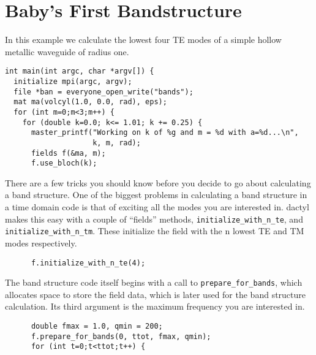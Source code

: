 \begin{comment}
/*
\end{comment}
\section{Baby's First Bandstructure}
\begin{comment}
*/
\end{comment}

\begin{comment}
#include <stdio.h>
#include <stdlib.h>
#include "dactyl.h"

double eps(const vec &) {
  return 1.0;
}
const int rad = 10;
const int ttot = 1500*rad;
\end{comment}

In this example we calculate the lowest four TE modes of a simple hollow
metallic waveguide of radius one.

\begin{verbatim}
int main(int argc, char *argv[]) {
  initialize mpi(argc, argv);
  file *ban = everyone_open_write("bands");
  mat ma(volcyl(1.0, 0.0, rad), eps);
  for (int m=0;m<3;m++) {
    for (double k=0.0; k<= 1.01; k += 0.25) {
      master_printf("Working on k of %g and m = %d with a=%d...\n",
                    k, m, rad);
      fields f(&ma, m);
      f.use_bloch(k);
\end{verbatim}

There are a few tricks you should know before you decide to go about
calculating a band structure.  One of the biggest problems in calculating a
band structure in a time domain code is that of exciting all the modes you
are interested in.  dactyl makes this easy with a couple of ``fields''
methods, \verb-initialize_with_n_te-, and \verb-initialize_with_n_tm-.
These initialize the field with the n lowest TE and TM modes respectively.

\begin{verbatim}
      f.initialize_with_n_te(4);
\end{verbatim}

The band structure code itself begins with a call to
\verb-prepare_for_bands-, which allocates space to store the field
data, which is later used for the band structure calculation.  Its third
argument is the maximum frequency you are interested in.

\begin{verbatim}
      double fmax = 1.0, qmin = 200;
      f.prepare_for_bands(0, ttot, fmax, qmin);
      for (int t=0;t<ttot;t++) {
\end{verbatim}

